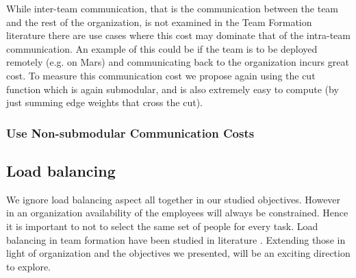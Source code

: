 While inter-team communication, that is the communication between the team and the rest of the organization, is not examined in the Team Formation literature there are use cases where this cost may dominate that of the intra-team communication. An example of this could be if the team is to be deployed remotely (e.g. on Mars) and communicating back to the organization incurs great cost. To measure this communication cost we propose again using the cut function which is again submodular, and is also extremely easy to compute (by just summing edge weights that cross the cut).

\subsubsection{Use Non-submodular Communication Costs}

\subsection{Load balancing}

We ignore load balancing aspect all together in our studied objectives. However in an organization availability of the employees will always be constrained. Hence it is important to not to select the same set of people for every task. Load balancing in team formation have been studied in literature \cite{wang2016ustf,liu2017simple}. Extending those in light of organization and the objectives we presented, will be an exciting direction to explore. 

  